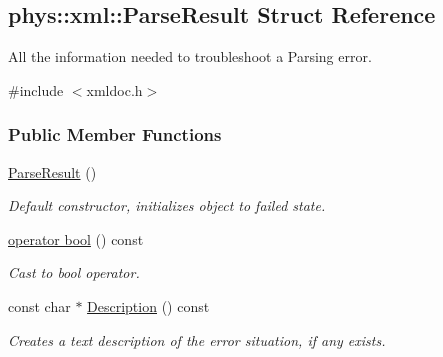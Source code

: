 \hypertarget{structphys_1_1xml_1_1ParseResult}{
\subsection{phys::xml::ParseResult Struct Reference}
\label{d5/dea/structphys_1_1xml_1_1ParseResult}
}


All the information needed to troubleshoot a Parsing error.  




{\ttfamily \#include $<$xmldoc.h$>$}

\subsubsection*{Public Member Functions}
\begin{DoxyCompactItemize}
\item 
\hypertarget{structphys_1_1xml_1_1ParseResult_aa7520df050e866122a0cf67bf306e323}{
\hyperlink{structphys_1_1xml_1_1ParseResult_aa7520df050e866122a0cf67bf306e323}{ParseResult} ()}
\label{d5/dea/structphys_1_1xml_1_1ParseResult_aa7520df050e866122a0cf67bf306e323}

\begin{DoxyCompactList}\small\item\em Default constructor, initializes object to failed state. \item\end{DoxyCompactList}\item 
\hyperlink{structphys_1_1xml_1_1ParseResult_a95c9989865c1bace7846995166a13e31}{operator bool} () const 
\begin{DoxyCompactList}\small\item\em Cast to bool operator. \item\end{DoxyCompactList}\item 
const char $\ast$ \hyperlink{structphys_1_1xml_1_1ParseResult_a7f31e89fbe1735e5092adfc352ae5a0d}{Description} () const 
\begin{DoxyCompactList}\small\item\em Creates a text description of the error situation, if any exists. \item\end{DoxyCompactList}\end{DoxyCompactItemize}
